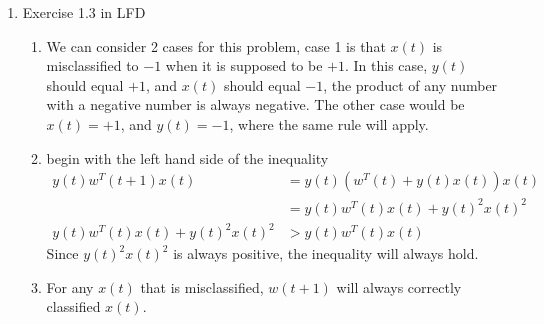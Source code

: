 \documentclass{article}
\begin{document}
    \begin{enumerate}
        \item Exercise 1.3 in LFD
        \begin{enumerate}[label=(\alph*)]
            \item We can consider 2 cases for this problem, case 1 is that $x(t)$ is misclassified to $-1$ when it is supposed to be $+1$. In this case, $y(t)$ should equal $+1$, and $x(t)$ should equal $-1$, the product of any number with a negative number is always negative. The other case would be $x(t) = +1$, and $y(t) = -1$, where the same rule will apply.
            \item begin with the left hand side of the inequality
            \begin{align*}
                y(t)w^T(t+1)x(t) &= y(t)(w^T(t) + y(t)x(t))x(t)\\
                &= y(t)w^T(t)x(t) + y(t)^2x(t)^2\\
                y(t)w^T(t)x(t) + y(t)^2x(t)^2 & > y(t)w^T(t)x(t)
            \end{align*}
            Since $y(t)^2x(t)^2$ is always positive, the inequality will always hold.
            \item For any $x(t)$ that is misclassified, $w(t+1)$ will always correctly classified $x(t)$.
        \end{enumerate}
    \end{enumerate}
\end{document}
